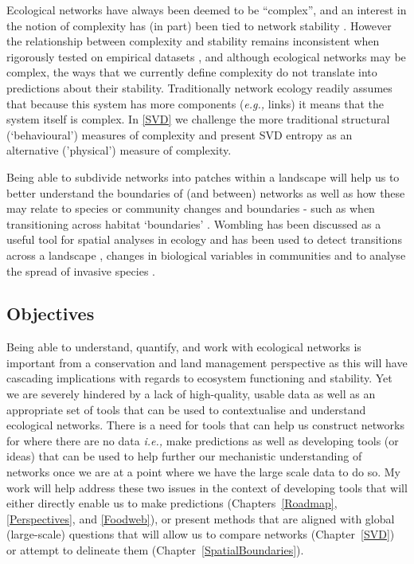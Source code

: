 Ecological networks have always been deemed to be ``complex'', and an interest in the notion of complexity has (in part) been tied to network stability \cite{Landi2018ComSta}. However the relationship between complexity and stability remains inconsistent when rigorously tested on empirical datasets \cite{Jacquet2016NoCom}, and although ecological networks may be complex, the ways that we currently define complexity do not translate into predictions about their stability. Traditionally network ecology readily assumes that because this system has more components (\emph{e.g.,} links) it means that the system itself is complex. In \autoref{SVD} we challenge the more traditional structural (`behavioural') measures of  complexity and present SVD entropy as an alternative ('physical') measure of complexity.

Being able to subdivide networks into patches within a landscape will help us to better understand the boundaries of (and between) networks as well as how these may relate to species or community changes and boundaries - such as when transitioning across habitat `boundaries' \cite{Hackett2019ResOur}. Wombling has been discussed as a useful tool for spatial analyses in ecology \cite{Fortin2005SpaAna} and has been used to detect transitions across a landscape \cite{Philibert2008SpaStr}, changes in biological variables in communities \cite{Barbujani1989DetReg} and to analyse the spread of invasive species \cite{Fitzpatrick2010EcoBou}.

\subsection{Objectives}\label{objectives-and-hypotheses}

Being able to understand, quantify, and work with ecological networks is
important from a conservation and land management perspective as this
will have cascading implications with regards to ecosystem functioning
and stability. Yet we are severely hindered by a lack of high-quality,
usable data as well as an appropriate set of tools that can be used to
contextualise and understand ecological networks. There is a need for
tools that can help us construct networks for where there are no data
\emph{i.e.,} make predictions as well as developing tools (or ideas) that
can be used to help further our mechanistic understanding of networks once
we are at a point where we have the large scale data to do so. My work will
help address these two issues in the context of developing tools that will
either directly enable us to make predictions (Chapters~\ref{Roadmap},
\ref{Perspectives}, and \ref{Foodweb}), or present methods that are aligned
with global (large-scale) questions that will allow us to compare networks
(Chapter~\ref{SVD}) or attempt to delineate them 
(Chapter~\ref{SpatialBoundaries}).

